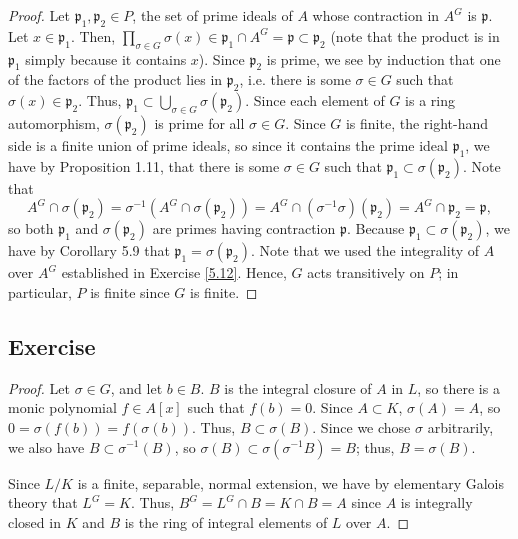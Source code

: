 \begin{proof}
Let $\mathfrak{p}_1,\mathfrak{p}_2 \in P$, the set of prime ideals of $A$ whose contraction in $A^G$ is $\mathfrak{p}$. Let $x \in \mathfrak{p}_1$.
Then, $\prod_{\sigma \in G}\sigma(x) \in \mathfrak{p}_1 \cap A^G = \mathfrak{p} \subset \mathfrak{p}_2$ (note that the product is in $\mathfrak{p}_1$
simply because it contains $x$). Since $\mathfrak{p}_2$ is prime, we see by induction that one of the factors of the product lies in $\mathfrak{p}_2$, 
i.e. there is some $\sigma \in G$ such that $\sigma(x) \in \mathfrak{p}_2$. Thus, $\mathfrak{p}_1 \subset \bigcup_{\sigma \in G}\sigma(\mathfrak{p}_2)$. 
Since each element of $G$ is a ring automorphism, $\sigma(\mathfrak{p}_2)$ is prime for all $\sigma \in G$. Since $G$ is finite, the right-hand side is 
a finite union of prime ideals, so since it contains the prime ideal $\mathfrak{p}_1$, we have by Proposition 1.11, that there is some $\sigma \in G$ 
such that $\mathfrak{p}_1 \subset \sigma(\mathfrak{p}_2)$. Note that 
$$A^G \cap \sigma(\mathfrak{p}_2) = \sigma^{-1}(A^G \cap \sigma(\mathfrak{p}_2)) 
= A^G \cap (\sigma^{-1}\sigma)(\mathfrak{p}_2) = A^G \cap \mathfrak{p}_2 = \mathfrak{p},$$
so both $\mathfrak{p}_1$ and $\sigma(\mathfrak{p}_2)$ are primes having contraction $\mathfrak{p}$. Because $\mathfrak{p}_1 \subset \sigma(\mathfrak{p}_2)$, 
we have by Corollary 5.9 that $\mathfrak{p}_1 = \sigma(\mathfrak{p}_2)$. Note that we used the integrality of $A$ over $A^G$ established in Exercise \ref{5.12}.
Hence, $G$ acts transitively on $P$; in particular, $P$ is finite since $G$ is finite.
\end{proof}

\subsection{Exercise}\label{5.14}

\begin{proof}
Let $\sigma \in G$, and let $b \in B$. $B$ is the integral closure of $A$ in $L$, so there is a monic polynomial $f \in A[x]$ such that
$f(b) = 0$. Since $A \subset K$, $\sigma(A) = A$, so $0 = \sigma(f(b)) = f(\sigma(b))$. Thus, $B \subset \sigma(B)$. Since we chose $\sigma$
arbitrarily, we also have $B \subset \sigma^{-1}(B)$, so $\sigma(B) \subset \sigma(\sigma^{-1}B) = B$; thus, $B = \sigma(B)$.

Since $L/K$ is a finite, separable, normal extension, we have by elementary Galois theory that $L^G = K$. Thus, $B^G = L^G \cap B = K \cap B = A$
since $A$ is integrally closed in $K$ and $B$ is the ring of integral elements of $L$ over $A$.
\end{proof}

